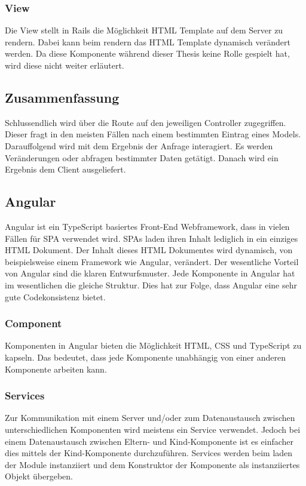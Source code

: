 \documentclass[paper=a4,fontsize=12pt,parskip=half]{scrartcl}
\begin{document}
	\subsubsection{View}
	\label{sec: rails_view}
	Die View stellt in Rails die Möglichkeit \gls{HTML} Template auf dem Server zu rendern. Dabei kann beim rendern das \gls{HTML} Template dynamisch verändert werden. Da diese Komponente während dieser Thesis keine Rolle gespielt hat, wird diese nicht weiter erläutert.

	\subsection{Zusammenfassung}
	\label{sec: rails_resuemee}
	Schlussendlich wird über die Route auf den jeweiligen Controller zugegriffen. Dieser fragt in den meisten Fällen nach einem bestimmten Eintrag eines Models. Darauffolgend wird mit dem Ergebnis der Anfrage interagiert. Es werden Veränderungen oder abfragen bestimmter Daten getätigt. Danach wird ein Ergebnis dem Client ausgeliefert.




	\subsection{Angular}
	\label{sec: angular}
	Angular ist ein TypeScript basiertes Front-End Webframework, dass in vielen Fällen für \gls{SPA} verwendet wird. \gls{SPA}s laden ihren Inhalt lediglich in ein einziges \gls{HTML} Dokument. Der Inhalt dieses \gls{HTML} Dokumentes wird dynamisch, von beispielsweise einem Framework wie Angular, verändert. Der wesentliche Vorteil von Angular sind die klaren Entwurfsmuster. Jede Komponente in Angular hat im wesentlichen die gleiche Struktur. Dies hat zur Folge, dass Angular eine sehr gute Codekonsistenz bietet.


	\subsubsection{Component}
	\label{sec: ang-component}
	Komponenten in Angular bieten die Möglichkeit \gls{HTML}, \gls{CSS} und TypeScript zu kapseln. Das bedeutet, dass jede Komponente unabhängig von einer anderen Komponente arbeiten kann.

	\subsubsection{Services}
	\label{sec: ang-service}
	Zur Kommunikation mit einem Server und/oder zum Datenaustausch zwischen unterschiedlichen Komponenten wird meistens ein Service verwendet. Jedoch bei einem Datenaustausch zwischen Eltern- und Kind-Komponente ist es einfacher dies mittels der Kind-Komponente durchzuführen. Services werden beim laden der Module instanziiert und dem Konstruktor der Komponente als instanziiertes Objekt übergeben.
\end{document}

